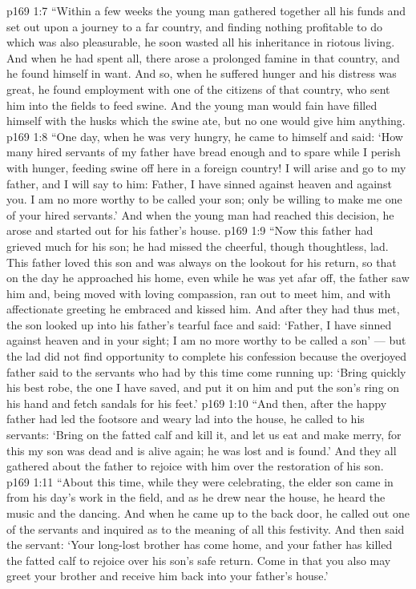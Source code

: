 \vs p169 1:7 \textcolor{ubdarkred}{“Within a few weeks the young man gathered together all his funds and set out upon a journey to a far country, and finding nothing profitable to do which was also pleasurable, he soon wasted all his inheritance in riotous living. And when he had spent all, there arose a prolonged famine in that country, and he found himself in want. And so, when he suffered hunger and his distress was great, he found employment with one of the citizens of that country, who sent him into the fields to feed swine. And the young man would fain have filled himself with the husks which the swine ate, but no one would give him anything.}
\vs p169 1:8 \textcolor{ubdarkred}{“One day, when he was very hungry, he came to himself and said: ‘How many hired servants of my father have bread enough and to spare while I perish with hunger, feeding swine off here in a foreign country! I will arise and go to my father, and I will say to him: Father, I have sinned against heaven and against you. I am no more worthy to be called your son; only be willing to make me one of your hired servants.’ And when the young man had reached this decision, he arose and started out for his father’s house.}
\vs p169 1:9 \textcolor{ubdarkred}{“Now this father had grieved much for his son; he had missed the cheerful, though thoughtless, lad. This father loved this son and was always on the lookout for his return, so that on the day he approached his home, even while he was yet afar off, the father saw him and, being moved with loving compassion, ran out to meet him, and with affectionate greeting he embraced and kissed him. And after they had thus met, the son looked up into his father’s tearful face and said: ‘Father, I have sinned against heaven and in your sight; I am no more worthy to be called a son’ --- but the lad did not find opportunity to complete his confession because the overjoyed father said to the servants who had by this time come running up: ‘Bring quickly his best robe, the one I have saved, and put it on him and put the son’s ring on his hand and fetch sandals for his feet.’}
\vs p169 1:10 \textcolor{ubdarkred}{“And then, after the happy father had led the footsore and weary lad into the house, he called to his servants: ‘Bring on the fatted calf and kill it, and let us eat and make merry, for this my son was dead and is alive again; he was lost and is found.’ And they all gathered about the father to rejoice with him over the restoration of his son.}
\vs p169 1:11 \textcolor{ubdarkred}{“About this time, while they were celebrating, the elder son came in from his day’s work in the field, and as he drew near the house, he heard the music and the dancing. And when he came up to the back door, he called out one of the servants and inquired as to the meaning of all this festivity. And then said the servant: ‘Your long\hyp{}lost brother has come home, and your father has killed the fatted calf to rejoice over his son’s safe return. Come in that you also may greet your brother and receive him back into your father’s house.’}
